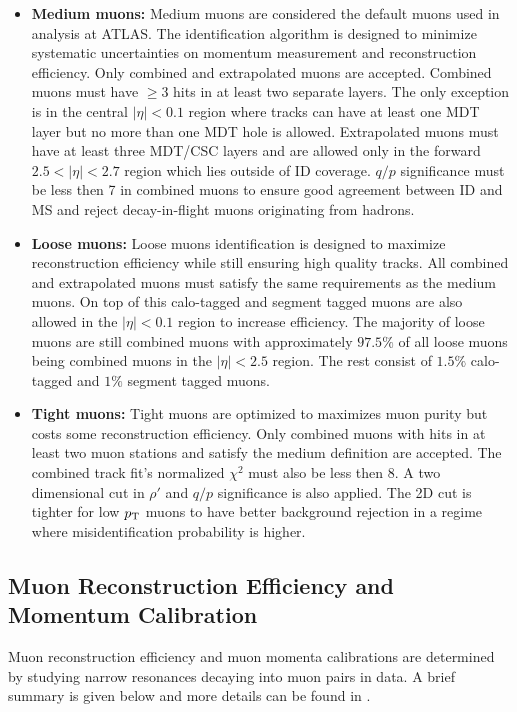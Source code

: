\begin{itemize}
\item[] {\bf Medium muons:} Medium muons are considered the default muons used in analysis at ATLAS.  The identification algorithm is designed to minimize systematic uncertainties on momentum measurement and reconstruction efficiency.  Only combined and extrapolated muons are accepted.  Combined muons must have $\ge 3$ hits in at least two separate layers.  The only exception is in the central $|\eta|<0.1$ region where tracks can have at least one MDT layer but no more than one MDT hole is allowed.  Extrapolated muons must have at least three MDT/CSC layers and are allowed only in the forward $2.5 < |\eta| < 2.7$ region which lies outside of ID coverage. $q/p$ significance must be less then 7 in combined muons to ensure good agreement between ID and MS and reject decay-in-flight muons originating from hadrons. 
\item[] {\bf Loose muons:} Loose muons identification is designed to maximize reconstruction efficiency while still ensuring high quality tracks. All combined and extrapolated muons must satisfy the same requirements as the medium muons.  On top of this calo-tagged and segment tagged muons are also allowed in the $|\eta|<0.1$ region to increase efficiency.  The majority of loose muons are still combined muons with approximately $97.5\%$ of all loose muons being combined muons in the $|\eta|<2.5$ region.  The rest consist of $1.5\%$ calo-tagged and $1\%$ segment tagged muons.
\item[] {\bf Tight muons:} Tight muons are optimized to maximizes muon purity but costs some reconstruction efficiency.  Only combined muons with hits in at least two muon stations and satisfy the medium definition are accepted.  The combined track fit's normalized $\chi^2$ must also be less then 8.  A two dimensional cut in $\rho\prime$ and $q/p$ significance is also applied.  The 2D cut is tighter for low $p_{\mathrm{T}}$ muons to have better background rejection in a regime where misidentification probability is higher.
\end{itemize}

\subsection{Muon Reconstruction Efficiency and Momentum Calibration}
\label{sec:reco:muonEff}

\indent Muon reconstruction efficiency and muon momenta calibrations are determined by studying narrow resonances decaying into muon pairs in data.  A brief summary is given below and more details can be found in \cite{MuonReco}.

